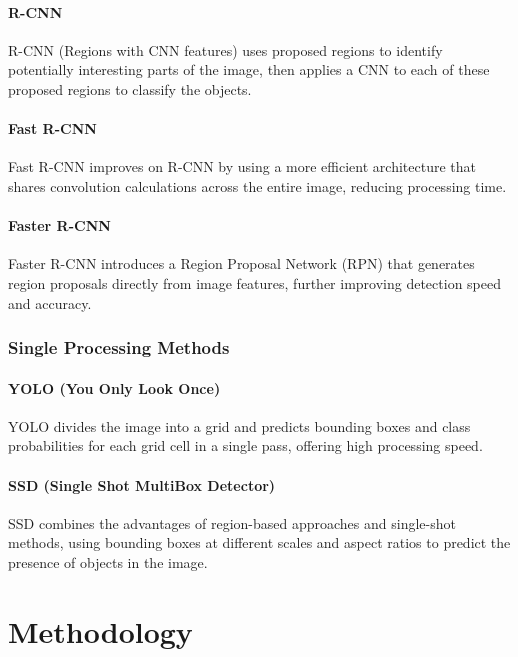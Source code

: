\documentclass[12pt,oneside]{book} %
\begin{document}
\subsubsection{R-CNN}

R-CNN (Regions with CNN features) uses proposed regions to identify potentially
interesting parts of the image, then applies a CNN to each of these proposed
regions to classify the objects.

\subsubsection{Fast R-CNN}

Fast R-CNN improves on R-CNN by using a more efficient architecture that shares
convolution calculations across the entire image, reducing processing time.

\subsubsection{Faster R-CNN}

Faster R-CNN introduces a Region Proposal Network (RPN) that generates region
proposals directly from image features, further improving detection speed and
accuracy.

\subsection{Single Processing Methods}

\subsubsection{YOLO (You Only Look Once)}

YOLO divides the image into a grid and predicts bounding boxes and class
probabilities for each grid cell in a single pass, offering high processing
speed.

\subsubsection{SSD (Single Shot MultiBox Detector)}

SSD combines the advantages of region-based approaches and single-shot methods,
using bounding boxes at different scales and aspect ratios to predict the
presence of objects in the image.

\chapter{Methodology}
\end{document}
